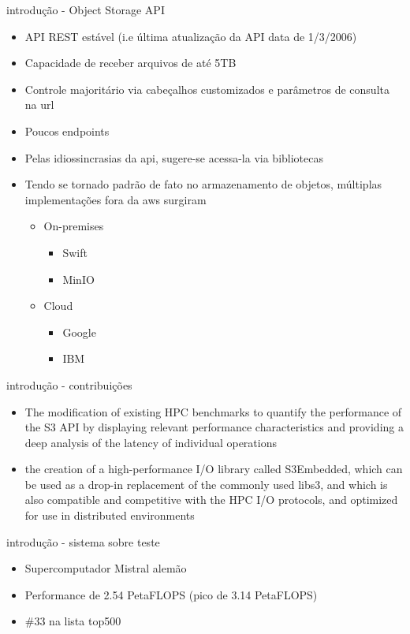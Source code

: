 \documentclass{beamer}
\begin{document}
\begin{frame}{introdução - Object Storage API}
	\begin{itemize}
		\item API REST estável (i.e última atualização da API data de 1/3/2006)
		\pause
		\item Capacidade de receber arquivos de até 5TB
		\pause
		\item Controle majoritário via cabeçalhos customizados e parâmetros de consulta na url
		\pause
		\item Poucos endpoints
		\pause
		\item Pelas idiossincrasias da api, sugere-se acessa-la via bibliotecas
		\pause
		\item Tendo se tornado padrão de fato no armazenamento de objetos, múltiplas implementações fora da aws surgiram
		\begin{itemize}
			\item On-premises
				\begin{itemize}
					\item Swift
					\item MinIO
				\end{itemize}
			\item Cloud
				\begin{itemize}
					\item Google
					\item IBM
				\end{itemize}
		\end{itemize}
	\end{itemize}
\end{frame}
\begin{frame}{introdução - contribuições}
\begin{itemize}
    \item The modification of
existing HPC benchmarks to quantify the performance of the S3 API by displaying relevant performance characteristics and providing a deep analysis of the latency of individual operations
    \item the creation of a high-performance I/O library called S3Embedded, which can be used as a drop-in replacement of the commonly used libs3, and which is also compatible and competitive with the HPC I/O protocols, and optimized for use in
distributed environments
\end{itemize}
\end{frame}
\begin{frame}{introdução - sistema sobre teste}
	\begin{itemize}
		\item Supercomputador Mistral alemão
		\item Performance de 2.54 PetaFLOPS (pico de 3.14 PetaFLOPS)
		\item \#33 na lista top500
	\end{itemize}
\end{frame}
\end{document}
